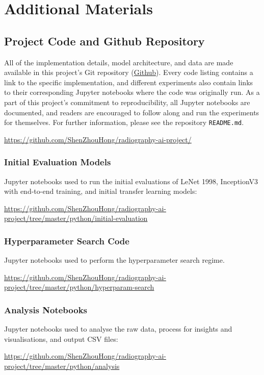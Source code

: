 \setlength{\headwidth}{\textwidth}

\chapter{Additional Materials}

\section{Project Code and Github Repository}

All of the implementation details, model architecture, and data are made available in this project's Git repository (\href{https://github.com/ShenZhouHong/radiography-ai-project/}{Github}). Every code listing contains a link to the specific implementation, and different experiments also contain links to their corresponding Jupyter notebooks where the code was originally run. As a part of this project's commitment to reproducibility, all Jupyter notebooks are documented, and readers are encouraged to follow along and run the experiments for themselves. For further information, please see the repository \texttt{README.md}.

\url{https://github.com/ShenZhouHong/radiography-ai-project/}

\subsection{Initial Evaluation Models}

Jupyter notebooks used to run the initial evaluations of LeNet 1998, InceptionV3 with end-to-end training, and initial transfer learning models:

\url{https://github.com/ShenZhouHong/radiography-ai-project/tree/master/python/initial-evaluation}

\subsection{Hyperparameter Search Code}

Jupyter notebooks used to perform the hyperparameter search regime.

\url{https://github.com/ShenZhouHong/radiography-ai-project/tree/master/python/hyperparam-search}

\subsection{Analysis Notebooks}

Jupyter notebooks used to analyse the raw data, process for insights and visualisations, and output CSV files:

\url{https://github.com/ShenZhouHong/radiography-ai-project/tree/master/python/analysis}